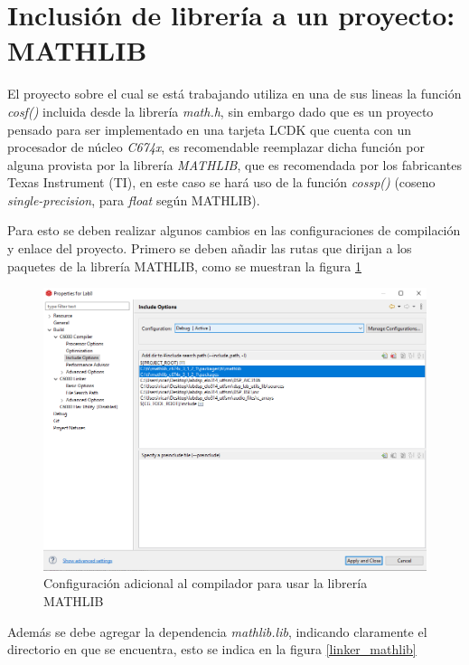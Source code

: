 \section{Inclusión de librería a un proyecto: MATHLIB}


El proyecto sobre el cual se está trabajando utiliza en una de sus lineas la función \textit{cosf()} incluida desde la librería \textit{math.h}, sin embargo dado que es un proyecto pensado para ser implementado en una tarjeta LCDK que cuenta con un procesador de núcleo \textit{C674x}, es recomendable reemplazar dicha función por alguna provista por la librería \textit{MATHLIB}, que es recomendada por los fabricantes Texas Instrument (TI), en este caso se hará uso de la función \textit{cossp()}  (coseno \textit{single-precision}, para \textit{float} según MATHLIB).


Para esto se deben realizar algunos cambios en las configuraciones de compilación y enlace del proyecto. Primero se deben añadir las rutas que dirijan a los paquetes de la librería MATHLIB, como se muestran la figura \ref{path_mathlib}




\begin{figure}[H]
    \centering
    \includegraphics[scale = 0.6]{figures/mathlib_compiler.png}
    \caption{Configuración adicional al compilador para usar la librería MATHLIB}
    \label{path_mathlib}
\end{figure}


 Además se debe agregar la dependencia \textit{mathlib.lib}, indicando claramente el directorio en que se encuentra, esto se indica en la figura \ref{linker_mathlib}

